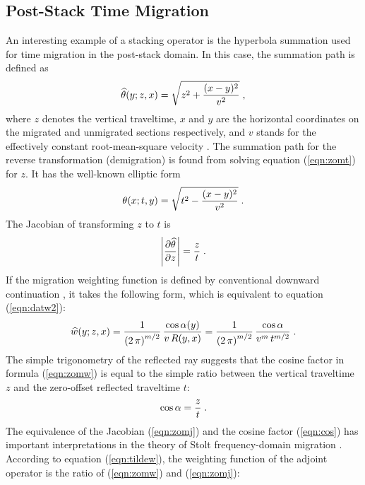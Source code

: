 \subsection{Post-Stack Time Migration}
An interesting example of a stacking operator is the hyperbola summation
used for time migration in the post-stack domain. In this case, the
summation path is defined as
\begin{equation}
\widehat{\theta}(y;z,x)  =  \sqrt{z^2+{{(x-y)^2}\over {v^2}}}\;,
\label{eqn:zomt}
\end{equation}
where $z$ denotes the vertical traveltime, $x$ and $y$ are the
horizontal coordinates on the migrated and unmigrated sections
respectively, and $v$ stands for the effectively constant
root-mean-square velocity \cite[]{Claerbout.bei.95}.  The summation path
for the reverse transformation (demigration) is found from solving
equation (\ref{eqn:zomt}) for $z$. It has the well-known elliptic form
\begin{equation}
\theta(x;t,y)  =  \sqrt{t^2-{{(x-y)^2}\over {v^2}}}\;.
\end{equation}
The Jacobian of transforming $z$ to $t$ is
\begin{equation}
\left|\partial \widehat{\theta} \over \partial z\right| = {z \over t}\;.
\label{eqn:zomj}
\end{equation}
If the migration weighting function is defined by conventional
downward continuation \cite[]{GEO43.01.00490076}, it takes the following form,
which is equivalent to equation (\ref{eqn:datw2}):
\begin{equation}
\widehat{w}(y;z,x)  =  {1\over{\left(2\,\pi\right)^{m/2}}} \,
{{\cos{\alpha(y)}}\over {v\,R(y,x)}} = 
{1\over{\left(2\,\pi\right)^{m/2}}} \,
{\cos{\alpha} \over {v^m\,t^{m/2}}}\;.
\label{eqn:zomw}
\end{equation}
The simple trigonometry of the reflected ray suggests that the cosine
factor in formula (\ref{eqn:zomw}) is equal to the simple ratio between the
vertical traveltime $z$ and the zero-offset reflected traveltime $t$:
\begin{equation}
\cos{\alpha} =  {z \over t}\;.
\label{eqn:cos}
\end{equation}
The equivalence of the Jacobian (\ref{eqn:zomj}) and the cosine factor
(\ref{eqn:cos}) has important interpretations in the theory of Stolt
frequency-domain migration
\cite[]{GEO43.01.00230048,GEO46.05.07170733,Levin.sep.48.147}.
According to equation (\ref{eqn:tildew}), the weighting function of the
adjoint operator is the ratio of (\ref{eqn:zomw}) and (\ref{eqn:zomj}):
